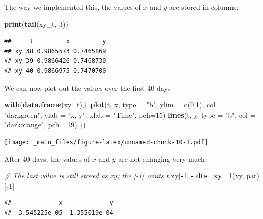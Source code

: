 \documentclass[
]{book}
\newenvironment{Shaded}{\begin{snugshade}}{\end{snugshade}}
\newcommand{\AttributeTok}[1]{\textcolor[rgb]{0.13,0.29,0.53}{#1}}
\newcommand{\CommentTok}[1]{\textcolor[rgb]{0.56,0.35,0.01}{\textit{#1}}}
\newcommand{\DecValTok}[1]{\textcolor[rgb]{0.00,0.00,0.81}{#1}}
\newcommand{\FunctionTok}[1]{\textcolor[rgb]{0.13,0.29,0.53}{\textbf{#1}}}
\newcommand{\NormalTok}[1]{#1}
\newcommand{\SpecialCharTok}[1]{\textcolor[rgb]{0.81,0.36,0.00}{\textbf{#1}}}
\newcommand{\StringTok}[1]{\textcolor[rgb]{0.31,0.60,0.02}{#1}}
\begin{document}
The way we implemented this, the values of \(x\) and \(y\) are stored in columns:

\begin{Shaded}
\begin{Highlighting}[]
\FunctionTok{print}\NormalTok{(}\FunctionTok{tail}\NormalTok{(xy\_t, }\DecValTok{3}\NormalTok{)) }
\end{Highlighting}
\end{Shaded}

\begin{verbatim}
##     t         x         y
## xy 38 0.9865573 0.7465869
## xy 39 0.9866426 0.7468730
## xy 40 0.9866975 0.7470700
\end{verbatim}

We can now plot out the values over the first 40 days

\begin{Shaded}
\begin{Highlighting}[]
\FunctionTok{with}\NormalTok{(}\FunctionTok{data.frame}\NormalTok{(xy\_t),\{}
  \FunctionTok{plot}\NormalTok{(t, x, }\AttributeTok{type =} \StringTok{"b"}\NormalTok{, }\AttributeTok{ylim =} \FunctionTok{c}\NormalTok{(}\DecValTok{0}\NormalTok{,}\DecValTok{1}\NormalTok{), }\AttributeTok{col =} \StringTok{"darkgreen"}\NormalTok{, }\AttributeTok{ylab =} \StringTok{"x, y"}\NormalTok{, }\AttributeTok{xlab =} \StringTok{"Time"}\NormalTok{, }\AttributeTok{pch=}\DecValTok{15}\NormalTok{)}
  \FunctionTok{lines}\NormalTok{(t, y, }\AttributeTok{type =} \StringTok{"b"}\NormalTok{, }\AttributeTok{col =} \StringTok{"darkorange"}\NormalTok{, }\AttributeTok{pch =}\DecValTok{19}\NormalTok{)}
\NormalTok{\})}
\end{Highlighting}
\end{Shaded}

\texttt{[image: \_main\_files/figure-latex/unnamed-chunk-10-1.pdf]}

After 40 days, the values of \(x\) and \(y\) are not changing very much:

\begin{Shaded}
\begin{Highlighting}[]
\CommentTok{\# The last value is still stored as xy; the [{-}1] omits t}
\NormalTok{xy[}\SpecialCharTok{{-}}\DecValTok{1}\NormalTok{] }\SpecialCharTok{{-}} \FunctionTok{dts\_xy\_1}\NormalTok{(xy, par)[}\SpecialCharTok{{-}}\DecValTok{1}\NormalTok{]}
\end{Highlighting}
\end{Shaded}

\begin{verbatim}
##             x             y 
## -3.545225e-05 -1.355019e-04
\end{verbatim}
\end{document}
